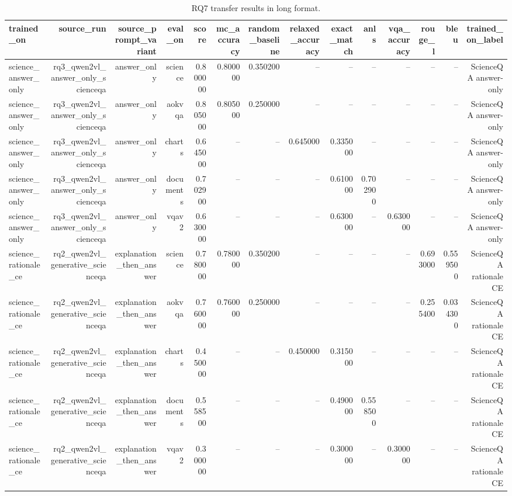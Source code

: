 \begin{table}
\caption{RQ7 transfer results in long format.}
\label{tab:rq7_transfer_long}
\begin{tabular}{lrrrrrrrrrrrrr}
\toprule
trained_on & source_run & source_prompt_variant & eval_on & score & mc_accuracy & random_baseline & relaxed_accuracy & exact_match & anls & vqa_accuracy & rouge_l & bleu & trained_on_label \\
\midrule
science_answer_only & rq3_qwen2vl_answer_only_scienceqa & answer_only & science & 0.800000 & 0.800000 & 0.350200 & -- & -- & -- & -- & -- & -- & ScienceQA
answer-only \\
science_answer_only & rq3_qwen2vl_answer_only_scienceqa & answer_only & aokvqa & 0.805000 & 0.805000 & 0.250000 & -- & -- & -- & -- & -- & -- & ScienceQA
answer-only \\
science_answer_only & rq3_qwen2vl_answer_only_scienceqa & answer_only & charts & 0.645000 & -- & -- & 0.645000 & 0.335000 & -- & -- & -- & -- & ScienceQA
answer-only \\
science_answer_only & rq3_qwen2vl_answer_only_scienceqa & answer_only & documents & 0.702900 & -- & -- & -- & 0.610000 & 0.702900 & -- & -- & -- & ScienceQA
answer-only \\
science_answer_only & rq3_qwen2vl_answer_only_scienceqa & answer_only & vqav2 & 0.630000 & -- & -- & -- & 0.630000 & -- & 0.630000 & -- & -- & ScienceQA
answer-only \\
science_rationale_ce & rq2_qwen2vl_generative_scienceqa & explanation_then_answer & science & 0.780000 & 0.780000 & 0.350200 & -- & -- & -- & -- & 0.693000 & 0.559500 & ScienceQA
rationale CE \\
science_rationale_ce & rq2_qwen2vl_generative_scienceqa & explanation_then_answer & aokvqa & 0.760000 & 0.760000 & 0.250000 & -- & -- & -- & -- & 0.255400 & 0.034300 & ScienceQA
rationale CE \\
science_rationale_ce & rq2_qwen2vl_generative_scienceqa & explanation_then_answer & charts & 0.450000 & -- & -- & 0.450000 & 0.315000 & -- & -- & -- & -- & ScienceQA
rationale CE \\
science_rationale_ce & rq2_qwen2vl_generative_scienceqa & explanation_then_answer & documents & 0.558500 & -- & -- & -- & 0.490000 & 0.558500 & -- & -- & -- & ScienceQA
rationale CE \\
science_rationale_ce & rq2_qwen2vl_generative_scienceqa & explanation_then_answer & vqav2 & 0.300000 & -- & -- & -- & 0.300000 & -- & 0.300000 & -- & -- & ScienceQA
rationale CE \\

\end{tabular}
\end{table}
